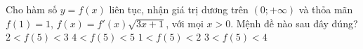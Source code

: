 \begin{ex}%
	Cho hàm số $y=f(x)$ liên tục, nhận giá trị dương trên $(0;+\infty)$ và thỏa mãn $f(1)=1$, $f(x)=f'(x)\sqrt{3x+1}$, với mọi $x>0$. Mệnh đề nào sau đây đúng?
	\choice
	{$2<f(5)<3 $}
	{$4<f(5)<5 $}
	{$1<f(5)<2 $}
	{\True $3<f(5)<4 $}
\end{ex}

